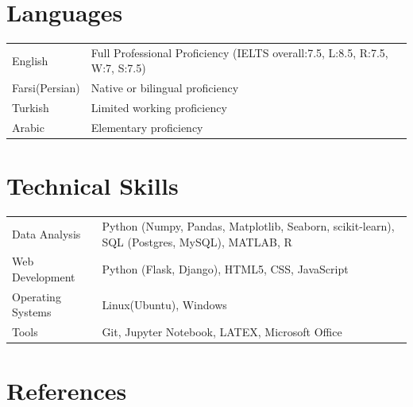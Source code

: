 \documentclass[a4paper,10pt]{article}
\begin{document}
\section{Languages}
\begin{tabularx}{\linewidth}{@{}l X@{}}
    English &  \normalsize{Full Professional Proficiency (IELTS overall:7.5, L:8.5, R:7.5, W:7, S:7.5)}\\
    Farsi(Persian) &  \normalsize{Native or bilingual proficiency}\\
    Turkish &  \normalsize{Limited working proficiency}\\  
    Arabic &  \normalsize{Elementary proficiency}\\ 
    
\end{tabularx}

\section{Technical Skills}
\begin{tabularx}{\linewidth}{@{}l X@{}}
    Data Analysis &  \normalsize{Python (Numpy, Pandas, Matplotlib, Seaborn, scikit-learn), SQL (Postgres, MySQL), MATLAB, R}\\
    Web Development &  \normalsize{Python (Flask, Django), HTML5, CSS, JavaScript}\\
    Operating Systems &  \normalsize{Linux(Ubuntu), Windows}\\  
    Tools &  \normalsize{Git, Jupyter Notebook, LATEX, Microsoft Office}\\ 
    
\end{tabularx}




\section{References}
\end{document}
